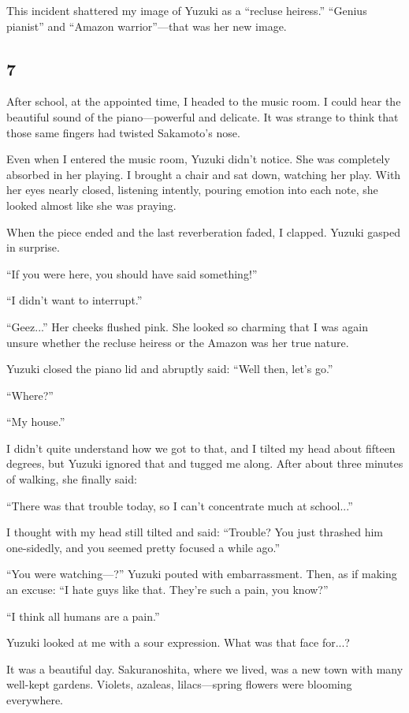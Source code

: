\documentclass[
    a4paper,
    12pt,
    twoside,
    openany,
    UTF8,
    fontset=windows
]{ctexbook}
\begin{document}
This incident shattered my image of Yuzuki as a ``recluse heiress.'' ``Genius pianist'' and ``Amazon warrior''---that was her new image.


\subsection*{7}

After school, at the appointed time, I headed to the music room. I could hear the beautiful sound of the piano---powerful and delicate. It was strange to think that those same fingers had twisted Sakamoto's nose.

Even when I entered the music room, Yuzuki didn't notice. She was completely absorbed in her playing. I brought a chair and sat down, watching her play. With her eyes nearly closed, listening intently, pouring emotion into each note, she looked almost like she was praying.

When the piece ended and the last reverberation faded, I clapped. Yuzuki gasped in surprise.

``If you were here, you should have said something!''

``I didn't want to interrupt.''

``Geez...'' Her cheeks flushed pink. She looked so charming that I was again unsure whether the recluse heiress or the Amazon was her true nature.

Yuzuki closed the piano lid and abruptly said: ``Well then, let's go.''

``Where?''

``My house.''

I didn't quite understand how we got to that, and I tilted my head about fifteen degrees, but Yuzuki ignored that and tugged me along. After about three minutes of walking, she finally said:

``There was that trouble today, so I can't concentrate much at school...''

I thought with my head still tilted and said: ``Trouble? You just thrashed him one-sidedly, and you seemed pretty focused a while ago.''

``You were watching---?'' Yuzuki pouted with embarrassment. Then, as if making an excuse: ``I hate guys like that. They're such a pain, you know?''

``I think all humans are a pain.''

Yuzuki looked at me with a sour expression. What was that face for...?

It was a beautiful day. Sakuranoshita, where we lived, was a new town with many well-kept gardens. Violets, azaleas, lilacs---spring flowers were blooming everywhere.
\end{document}
